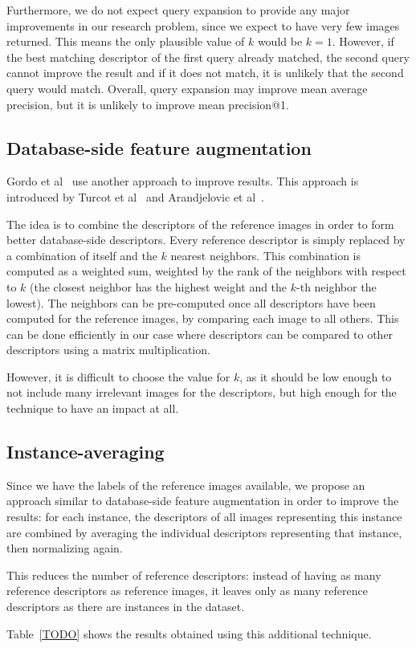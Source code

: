 Furthermore, we do not expect query expansion to provide
any major improvements in our research problem, since
we expect to have very few images returned. This means
the only plausible value of $k$ would be $k=1$. However,
if the best matching descriptor of the first query already
matched, the second query cannot improve the result
and if it does not match, it is unlikely that the second
query would match. Overall, query expansion may
improve mean average precision, but it is unlikely to
improve mean precision@1.

\subsection{Database-side feature augmentation}
Gordo et al~\cite{gordo_end--end_2016} use another
approach to improve results. This approach is introduced
by Turcot et al~\cite{turcot_better_2009} and
Arandjelovic et al~\cite{arandjelovic_three_2012}.

The idea is to combine the descriptors of the reference
images in order to form better database-side descriptors.
Every reference descriptor is simply replaced by a
combination of itself and the $k$ nearest neighbors.
This combination is computed as a weighted sum, weighted
by the rank of the neighbors with respect to $k$ (the
closest neighbor has the highest weight and the $k$-th
neighbor the lowest).
The neighbors can be pre-computed once all descriptors
have been computed for the reference images, by comparing
each image to all others. This can be done efficiently
in our case where descriptors can be compared to other
descriptors using a matrix multiplication.

However, it is difficult to choose the value for $k$, as
it should be low enough to not include many irrelevant
images for the descriptors, but high enough for the
technique to have an impact at all.

\subsection{Instance-averaging}
Since we have the labels of the reference images
available, we propose an approach similar to
database-side feature augmentation in order to
improve the results: for each instance, the descriptors
of all images representing this instance are combined
by averaging the individual descriptors representing
that instance, then normalizing again.

This reduces the number of reference descriptors:
instead of having as many reference descriptors as
reference images, it leaves only as many reference
descriptors as there are instances in the dataset.

Table~\ref{TODO} shows the results obtained
using this additional technique. %
